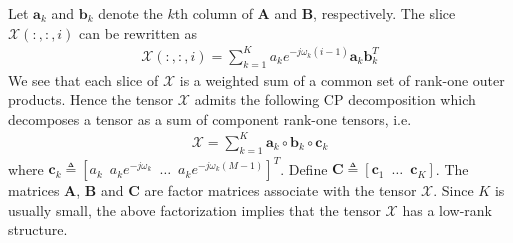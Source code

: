 \documentclass[10pt,journal,epsfig]{IEEEtran}
\begin{document}
Let $\boldsymbol{a}_k$ and $\boldsymbol{b}_k$ denote the $k$th
column of $\boldsymbol{A}$ and $\boldsymbol{B}$, respectively. The
slice $\boldsymbol{\mathcal{X}}(:,:,i)$ can be rewritten as
\begin{align}
\boldsymbol{\mathcal{X}}(:,:,i)=\sum_{k=1}^{K}a_k e^{-j\omega_k
(i-1)}\boldsymbol{a}_k\boldsymbol{b}_k^T
\end{align}
We see that each slice of $\boldsymbol{\mathcal{X}}$ is a weighted
sum of a common set of rank-one outer products. Hence the tensor
$\boldsymbol{\mathcal{X}}$ admits the following CP decomposition
which decomposes a tensor as a sum of component rank-one tensors,
i.e.
\begin{align}
\boldsymbol{\mathcal{X}}=\sum\limits_{k=1}^{K}\boldsymbol{a}_k\circ\boldsymbol{b}_k\circ\boldsymbol{c}_k
\end{align}
where $\boldsymbol{c}_k\triangleq [a_k\phantom{0} a_k
e^{-j\omega_k}\phantom{0}\ldots\phantom{0}a_k
e^{-j\omega_k(M-1)}]^T$. Define $\boldsymbol{C}\triangleq
[\boldsymbol{c}_1\phantom{0}\ldots\phantom{0}\boldsymbol{c}_K]$.
The matrices $\boldsymbol{A}$, $\boldsymbol{B}$ and
$\boldsymbol{C}$ are factor matrices associate with the tensor
$\boldsymbol{\mathcal{X}}$. Since $K$ is usually small, the above
factorization implies that the tensor $\boldsymbol{\mathcal{X}}$
has a low-rank structure.
\end{document}
